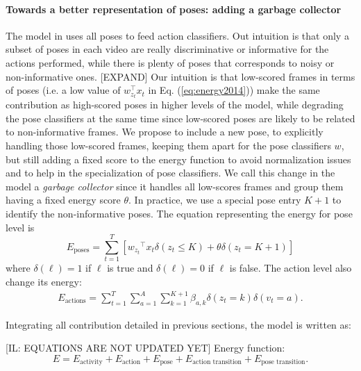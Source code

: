 \paragraph{Towards a better representation of poses: adding a garbage collector}

The model in \cite{Lillo2014} uses all poses to feed action classifiers. Out intuition is that only a subset of poses in each video are really discriminative or informative for the actions performed, while there is plenty of poses that corresponds to noisy or non-informative ones. [EXPAND] Our intuition is that low-scored frames in terms of poses (i.e. a low value of $w_{z_t}^\top x_t$ in Eq. (\ref{eq:energy2014})) make the same contribution as high-scored poses in higher levels of the model, while degrading the pose classifiers at the same time since low-scored poses are likely to be related to non-informative frames. We propose to include a new pose, to explicitly handling those low-scored frames, keeping them apart for the pose classifiers $w$, but still adding a fixed score to the energy function to avoid normalization issues and to help in the specialization of pose classifiers. We call this change in the model a \emph{garbage collector} since it handles all low-scores frames and group them having a fixed energy score $\theta$. In practice, we use a special pose entry $K+1$ to identify the non-informative poses. The equation representing the energy for pose level is
%
\begin{equation} \label{Eq_poseEnergy}
E_{\text{poses}}  = \sum_{t=1}^T \left[  {w_{z_t}}^\top x_{t}\delta(z_{t} \le  K) + \theta 
\delta(z_{t}=K+1)\right] 
\end{equation}
where $\delta(\ell) = 1$ if $\ell$ is true and $\delta(\ell) = 0$ if
$\ell$ is false. The action level also change its energy:
\begin{equation}
\begin{split}
 \label{Eq_actionEnergy}
E_{\text{actions}} =  \sum_{t=1}^T \sum_{a=1}^A \sum_{k=1}^{K+1}  \beta_{a,k} \delta(z_t = k) \delta(v_t = a).
\end{split}
\end{equation}

Integrating all contribution detailed in previous sections, the model is written as:

[IL: EQUATIONS ARE NOT UPDATED YET]
Energy function:
\begin{equation}
E = E_{\text{activity}} + E_{\text{action}} + E_{\text{pose}}
  + E_{\text{action transition}} + E_{\text{pose transition}}.
\end{equation}


